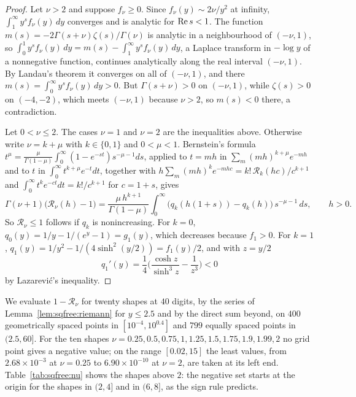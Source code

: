 \begin{proof}
Let $\nu>2$ and suppose $f_\nu\ge0$. Since $f_\nu(y)\sim2\nu/y^2$ at infinity, $\int_1^\infty y^sf_\nu(y)\,dy$ converges and is analytic for $\operatorname{Re} s<1$. The function $m(s)=-2\Gamma(s+\nu)\zeta(s)/\Gamma(\nu)$ is analytic in a neighbourhood of $(-\nu,1)$, so $\int_0^1y^sf_\nu(y)\,dy=m(s)-\int_1^\infty y^sf_\nu(y)\,dy$, a Laplace transform in $-\log y$ of a nonnegative function, continues analytically along the real interval $(-\nu,1)$. By Landau's theorem \cite[Chapter~II, Theorem~5b]{Widder41} it converges on all of $(-\nu,1)$, and there $m(s)=\int_0^\infty y^sf_\nu(y)\,dy>0$. But $\Gamma(s+\nu)>0$ on $(-\nu,1)$, while $\zeta(s)>0$ on $(-4,-2)$, which meets $(-\nu,1)$ because $\nu>2$, so $m(s)<0$ there, a contradiction.

Let $0<\nu\le2$. The cases $\nu=1$ and $\nu=2$ are the inequalities above. Otherwise write $\nu=k+\mu$ with $k\in\{0,1\}$ and $0<\mu<1$. Bernstein's formula $t^\mu=\frac\mu{\Gamma(1-\mu)}\int_0^\infty(1-e^{-st})s^{-\mu-1}ds$, applied to $t=mh$ in $\sum_m(mh)^{k+\mu}e^{-mh}$ and to $t$ in $\int_0^\infty t^{k+\mu}e^{-t}dt$, together with $h\sum_m(mh)^ke^{-mhc}=k!\,\mathcal R_k(hc)/c^{k+1}$ and $\int_0^\infty t^ke^{-ct}dt=k!/c^{k+1}$ for $c=1+s$, gives
\[
\Gamma(\nu+1)\big(\mathcal R_\nu(h)-1\big)=\frac{\mu\,h^{k+1}}{\Gamma(1-\mu)}\int_0^\infty\big(q_k(h(1+s))-q_k(h)\big)\,s^{-\mu-1}\,ds,\qquad h>0 .
\]
So $\mathcal R_\nu\le1$ follows if $q_k$ is nonincreasing. For $k=0$, $q_0(y)=1/y-1/(e^y-1)=g_1(y)$, which decreases because $f_1>0$. For $k=1$, $q_1(y)=1/y^2-1/(4\sinh^2(y/2))=f_1(y)/2$, and with $z=y/2$
\[
q_1'(y)=\frac14\Big(\frac{\cosh z}{\sinh^3z}-\frac1{z^3}\Big)<0
\]
by Lazarevi\'c's inequality.
\end{proof}

We evaluate $1-\mathcal R_\nu$ for twenty shapes at $40$ digits, by the series of Lemma~\ref{lem:sqfree:riemann} for $y\le2.5$ and by the direct sum beyond, on $400$ geometrically spaced points in $[10^{-4},10^{0.4}]$ and $799$ equally spaced points in $(2.5,60]$. For the ten shapes $\nu=0.25,0.5,0.75,1,1.25,1.5,1.75,1.9,1.99,2$ no grid point gives a negative value; on the range $[0.02,15]$ the least values, from $2.68\times10^{-3}$ at $\nu=0.25$ to $6.90\times10^{-10}$ at $\nu=2$, are taken at its left end. Table~\ref{tab:sqfree:nu} shows the shapes above $2$: the negative set starts at the origin for the shapes in $(2,4]$ and in $(6,8]$, as the sign rule predicts.

